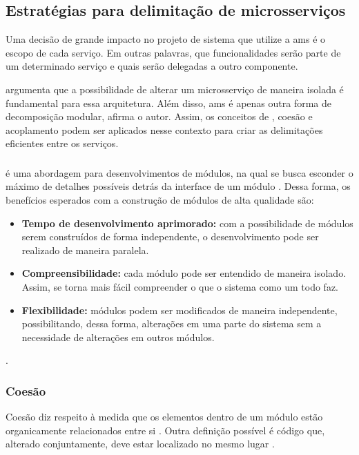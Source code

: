 \subsection{Estratégias para delimitação de microsserviços}
Uma decisão de grande impacto no projeto de sistema que utilize a \acrshort{ams} é o escopo de cada serviço. Em outras palavras, que funcionalidades serão parte de um determinado serviço e quais serão delegadas a outro componente.

 argumenta que a possibilidade de alterar um microsserviço de maneira isolada é fundamental para essa arquitetura. Além disso, \acrshort{ams} é apenas outra forma de decomposição modular, afirma o autor. Assim, os conceitos de , coesão e acoplamento podem ser aplicados nesse contexto para criar as delimitações eficientes entre os serviços.

\subsubsection{}
 é uma abordagem para desenvolvimentos de módulos, na qual se busca esconder o máximo de detalhes possíveis detrás da interface de um módulo \cite{buildingMicroservices}. Dessa forma, os benefícios esperados com a construção de módulos de alta qualidade são:
\begin{itemize}
    \item \textbf{Tempo de desenvolvimento aprimorado:} com a possibilidade de módulos serem construídos de forma independente, o desenvolvimento pode ser realizado de maneira paralela.
    \item \textbf{Compreensibilidade:} cada módulo pode ser entendido de maneira isolado. Assim, se torna mais fácil compreender o que o sistema como um todo faz.
    \item \textbf{Flexibilidade:} módulos podem ser modificados de maneira independente, possibilitando, dessa forma, alterações em uma parte do sistema sem a necessidade de alterações em outros módulos.
\end{itemize}
\cite{Parnas2012}.

\subsubsection{Coesão}
Coesão diz respeito à medida que os elementos dentro de um módulo estão organicamente relacionados entre si \cite{Yourdon1979}. Outra definição possível é código que, alterado conjuntamente, deve estar localizado no mesmo lugar \cite{buildingMicroservices}. 

